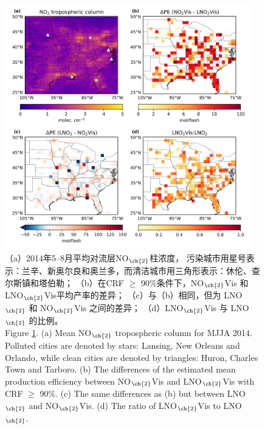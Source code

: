 \begin{figure}[H]
\centering
\includegraphics[width=0.95\textwidth]{./figures/us_delta.png}
\caption{（a）2014年5--8月平均对流层NO$_{\ch{2}}$柱浓度，
污染城市用星号表示：兰辛、新奥尔良和奥兰多，而清洁城市用三角形表示：休伦、查尔斯镇和塔伯勒；
（b）在CRF $\geq$ 90\%条件下，NO$_{\ch{2}}$Vis 和 LNO$_{\ch{2}}$Vis平均产率的差异；
（c）与（b）相同，但为 LNO$_{\ch{2}}$ 和 NO$_{\ch{2}}$Vis 之间的差异；
（d）LNO$_{\ch{2}}$Vis 与 LNO$_{\ch{2}}$ 的比例。\\
Figure \ref{fig:us_delta}.
(a) Mean NO$_{\ch{2}}$ tropospheric column for MJJA 2014.
Polluted cities are denoted by stars: Lansing, New Orleans and Orlando, while clean cities are denoted by triangles: Huron, Charles Town and Tarboro.
(b) The differences of the estimated mean production efficiency between NO$_{\ch{2}}$Vis and LNO$_{\ch{2}}$Vis with CRF $\geq$ 90\%.
(c) The same differences as (b) but between LNO$_{\ch{2}}$ and NO$_{\ch{2}}$Vis.
(d) The ratio of LNO$_{\ch{2}}$Vis to LNO$_{\ch{2}}$.
}
\label{fig:us_delta}
\end{figure}


